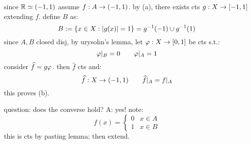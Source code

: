 \newpage
since $\mathbb{R}\simeq(-1,1)$ assume $f:A\rightarrow(-1,1)$.
by (a), there exists cts $g:X\rightarrow[-1,1]$ extending $f$.
define $B$ as:
\begin{equation*}
    B:=\left\{{x\in X:\abs{g(x)}=1}\right\} = g^{-1}(-1)\cup g^{-1}(1)
\end{equation*}
since $A,B$ closed disj, by urysohn's lemma, let $\varphi:X\rightarrow[0,1]$ be cts s.t.:
\begin{equation*}
    \varphi\rvert_{B}=0 \qquad \varphi\rvert_{A}=1
\end{equation*}
consider $\widehat{f}=g\varphi$.
then $\hat{f}$ cts and:
\begin{equation*}
    \widehat{f}:X\rightarrow(-1,1) \qquad \widehat{f}\rvert_{A}=f\rvert_{A}
\end{equation*}
this proves (b).

question: does the converse hold? A: yes! note:
\begin{equation*}
    f(x)=
    \begin{cases}
        0 & x\in A \\ 1 & x\in B
    \end{cases}
\end{equation*}
this is cts by pasting lemma; then extend.



